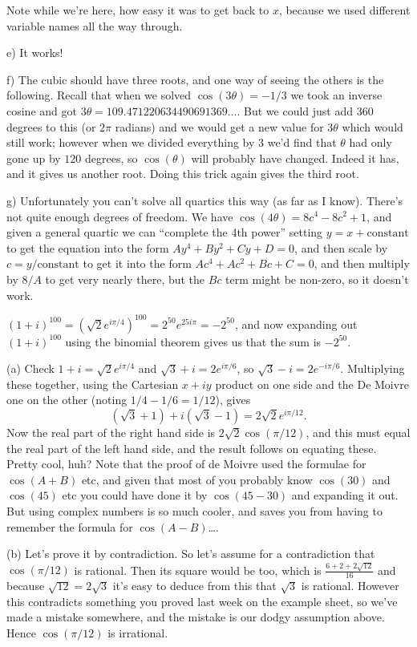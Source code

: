 \documentclass[10pt]{article}
\begin{document}
Note while we're here, how easy it was to get back to $x$, because we used different variable names all the way through.

e) It works!

f) The cubic should have three roots, and one way of seeing the others is the following. Recall that when we solved $\cos(3\theta)=-1/3$ we took an inverse cosine and got $3\theta=109.471220634490691369\ldots$. But we could just add 360 degrees to this (or $2\pi$ radians) and we would get a new value for $3\theta$ which would still work; however when we divided everything by 3 we'd find that $\theta$ had only gone up by $120$ degrees, so $\cos(\theta)$ will probably have changed. Indeed it has, and it gives us another root. Doing this trick again gives the third root.

g) Unfortunately you can't solve all quartics this way (as far as I know). There's not quite enough degrees of freedom. We have $\cos(4\theta)=8c^4-8c^2+1$, and given a general quartic we can ``complete the 4th power'' setting $y=x+\mbox{constant}$ to get the equation into the form $Ay^4+By^2+Cy+D=0$, and then scale by $c=y/\mbox{constant}$ to get it into the form $Ac^4+Ac^2+Bc+C=0$, and then multiply by $8/A$ to get very nearly there, but the $Bc$ term might be non-zero, so it doesn't work.

\medskip{} $(1+i)^{100}=\left(\sqrt{2}e^{i\pi/4}\right)^{100}=2^{50}e^{25i\pi}=-2^{50}$, and now expanding out $(1+i)^{100}$ using the binomial theorem gives us that the sum is $-2^{50}$.

\medskip{} 

(a) Check $1+i=\sqrt{2}e^{i\pi/4}$ and $\sqrt{3}+i=2e^{i\pi/6}$, so $\sqrt{3}-i=2e^{-i\pi/6}$. Multiplying these together, using the Cartesian $x+iy$ product on one side and the De Moivre one on the other (noting $1/4-1/6=1/12$), gives
$$(\sqrt{3}+1)+i(\sqrt{3}-1)=2\sqrt{2}e^{i\pi/12}.$$
Now the real part of the right hand side is $2\sqrt{2}\cos(\pi/12)$, and this must equal the real part of the left hand side, and the result follows on equating these. Pretty cool, huh? Note that the proof of de Moivre used the formulae for $\cos(A+B)$ etc, and given that most of you probably know $\cos(30)$ and $\cos(45)$ etc you could have done it by $\cos(45-30)$ and expanding it out. But using complex numbers is so much cooler, and saves you from having to remember the formula for $\cos(A-B)$\ldots.

(b) Let's prove it by contradiction. So let's assume for a contradiction that $\cos(\pi/12)$ is rational. Then its square would be too, which is $\frac{6+2+2\sqrt{12}}{16}$ and because $\sqrt{12}=2\sqrt{3}$ it's easy to deduce from this that $\sqrt{3}$ is rational. However this contradicts something you proved last week on the example sheet, so we've made a mistake somewhere, and the mistake is our dodgy assumption above. Hence $\cos(\pi/12)$ is irrational.
\end{document}

